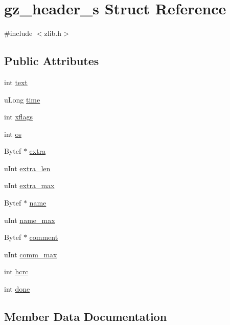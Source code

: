 \hypertarget{structgz__header__s}{}\section{gz\+\_\+header\+\_\+s Struct Reference}
\label{structgz__header__s}


{\ttfamily \#include $<$zlib.\+h$>$}

\subsection*{Public Attributes}
\begin{DoxyCompactItemize}
\item 
int \hyperlink{structgz__header__s_af94c3fadfed835a501bc1babc4b894f9}{text}
\item 
u\+Long \hyperlink{structgz__header__s_a5f00bb6f9689c1abf7a54dad449ce9d3}{time}
\item 
int \hyperlink{structgz__header__s_a40e35dc1a967c6537c6012cf5416210a}{xflags}
\item 
int \hyperlink{structgz__header__s_a2708d3180d30b0563e3c2c965865cd4f}{os}
\item 
Bytef $\ast$ \hyperlink{structgz__header__s_a397959afc459da7e296c676a3d4c1915}{extra}
\item 
u\+Int \hyperlink{structgz__header__s_a271798915d64ae1f0d25a3a814ca0aa3}{extra\+\_\+len}
\item 
u\+Int \hyperlink{structgz__header__s_ada4b174bf7ec0442b1091011c7342ca1}{extra\+\_\+max}
\item 
Bytef $\ast$ \hyperlink{structgz__header__s_a60ae5eee2882d1c25b3bb328972f0149}{name}
\item 
u\+Int \hyperlink{structgz__header__s_af503d267de15a461b81dcbbfb0d628e5}{name\+\_\+max}
\item 
Bytef $\ast$ \hyperlink{structgz__header__s_a1d4fd0807e838ce4bfde54aa021e18e9}{comment}
\item 
u\+Int \hyperlink{structgz__header__s_aa0529f45e5c08b3009cfc2a61a86aea0}{comm\+\_\+max}
\item 
int \hyperlink{structgz__header__s_a29fa8de3acff8d8c7bad61dc924d8564}{hcrc}
\item 
int \hyperlink{structgz__header__s_ab8fd11f59b76a7d031e24bede8679d9d}{done}
\end{DoxyCompactItemize}


\subsection{Member Data Documentation}
\hypertarget{structgz__header__s_aa0529f45e5c08b3009cfc2a61a86aea0}{}
